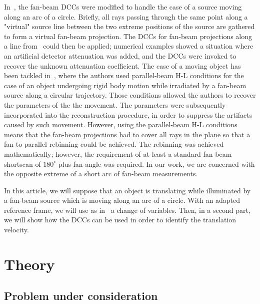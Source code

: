 \documentclass[letterpaper,twocolumn]{IEEEtran}
\begin{document}
In~\cite{clackdoyle2015consistency}, the fan-beam DCCs were modified to handle the case of a source moving along an arc of a circle. Briefly, all rays passing through the same point along a "virtual" source line between the two extreme positions of the source are gathered to form a virtual fan-beam projection. The DCCs for fan-beam projections along a line from~\cite{clackdoyle2013necessary} could then be applied; numerical examples showed a situation where an artificial detector attenuation was added, and the DCCs were invoked to recover the unknown attenuation coefficient. The case of a moving object has been tackled in~\cite{yu2007data}, where the authors used parallel-beam H-L conditions for the case of an object undergoing rigid body motion while irradiated by a fan-beam source along a circular trajectory. Those conditions allowed the authors to recover the parameters of the the movement. The parameters were subsequently incorporated into the reconstruction procedure, in order to suppress the artifacts caused by such movement.  However, using the parallel-beam H-L conditions means that the fan-beam projections had to cover all rays in the plane so that a fan-to-parallel rebinning could be achieved. The rebinning was achieved mathematically; however, the requirement of at least a standard fan-beam shortscan of $180^{\circ}$ plus fan-angle was required. In our work, we are concerned with the opposite extreme of a short arc of fan-beam measurements.

In this article, we will suppose that an object is translating while illuminated by a fan-beam source which is moving along an arc of a circle. With an adapted reference frame, we will use as in~\cite{clackdoyle2015consistency} a change of variables. Then, in a second part, we will show how the DCCs can be used in order to identify the translation velocity.

\section{Theory} 
\label{sec:theory}

\subsection{Problem under consideration}
\label{sub:problem_under_consideration}
\end{document}
